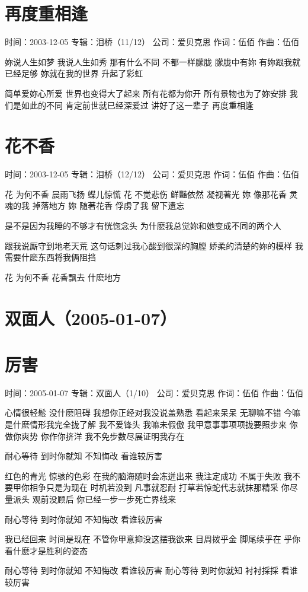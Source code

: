 \documentclass[UTF8,a4paper,oneside,twocolumn,12pt]{ctexbook}
\newcommand{\infopair}[2]{\textbullet #1：#2}
\newcommand{\zc}[1][伍佰]{\infopair{作词}{#1}}
\newcommand{\zq}[1][伍佰]{\infopair{作曲}{#1}}
\newcommand{\zj}[1]{\infopair{专辑}{#1}}
\newcommand{\sj}[1]{\infopair{时间}{#1}}
\newcommand{\gs}[1]{\infopair{公司}{#1}}
\newenvironment{info}{\begin{flushleft}\kaishu
	}
	{\end{flushleft}\normalsize\yahei\par}
\newenvironment{lyric}{
	}
{}
\begin{document}
\section{再度重相逢}
\begin{info}
	\sj{2003-12-05}
	\zj{泪桥（11/12）}
	\gs{爱贝克思}
	\zc
	\zq
\end{info}
\begin{lyric}
	妳说人生如梦 我说人生如秀
	那有什么不同 不都一样朦胧
	朦胧中有妳 有妳跟我就已经足够
	妳就在我的世界 升起了彩虹

	简单爱妳心所爱 世界也变得大了起来
	所有花都为你开 所有景物也为了妳安排
	我们是如此的不同 肯定前世就已经深爱过
	讲好了这一辈子 再度重相逢
\end{lyric}

\section{花不香}
\begin{info}
	\sj{2003-12-05}
	\zj{泪桥（12/12）}
	\gs{爱贝克思}
	\zc
	\zq
\end{info}
\begin{lyric}
	花 为何不香 晨雨飞扬 蝶儿惊慌
	花 不觉悲伤 鲜豔依然 凝视著光
	妳 像那花香 灵魂的我 掉落地方
	妳 随著花香 俘虏了我 留下遗忘

	是不是因为我睡的不够才有恍惚念头
	为什麽我总觉妳和她变成不同的两个人

	跟我说厮守到地老天荒
	这句话刺过我心酸到很深的胸膛
	娇柔的清楚的妳的模样
	我需要什麽东西将我俩阻挡

	花 为何不香 花香飘去 什麽地方
\end{lyric}

\section*{双面人（2005-01-07）}
\section{厉害}
\begin{info}
	\sj{2005-01-07}
	\zj{双面人（1/10）}
	\gs{爱贝克思}
	\zc
	\zq
\end{info}
\begin{lyric}
	心情很轻鬆 没什麽阻碍 我想你正经对我没说盖熟悉
	看起来呆呆 无聊嘛不错 今嘛是什麽情形我完全拢了解
	我不爱锋头 我嘛未假傲 我甲意事事项项拢要照步来
	你做你爽势 你作你挤洋 我不免步数尽展证明我存在

	耐心等待 到时你就知
	不知悔改 看谁较厉害

	红色的青光 惊骇的色彩 在我的脑海随时会冻迸出来
	我注定成功 不属于失败 我不要甲你相争只是为现在
	时机若没到 凡事就忍耐 打草若惊蛇代志就抹那精采
	你尽量派头 观前没顾后 你已经一步一步死亡界线来

	耐心等待 到时你就知
	不知悔改 看谁较厉害

	我已经回来 时间是现在 不管你甲意抑没这摆我欲来
	目周拨乎金 脚尾续乎在 乎你看什麽才是胜利的姿态

	耐心等待 到时你就知
	不知悔改 看谁较厉害
	耐心等待 到时你就知
	衬衬採採 看谁较厉害
\end{lyric}
\end{document}
